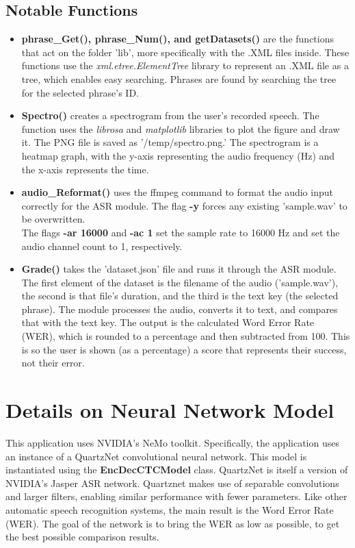 \documentclass[12pt, letterpaper]{article}
\begin{document}
\subsection*{Notable Functions}
\begin{itemize}
\item{\textbf{phrase\_Get(), phrase\_Num(), and getDatasets()} are the functions that act on the folder 'lib', more specifically with the .XML files inside. These functions use the \textit{xml.etree.ElementTree} library to represent an .XML file as a tree, which enables easy searching. Phrases are found by searching the tree for the selected phrase's ID.}

\item{\textbf{Spectro()} creates a spectrogram from the user's recorded speech. The function uses the \textit{librosa} and \textit{matplotlib} libraries to plot the figure and draw it. The PNG file is saved as '/temp/spectro.png.' The spectrogram is a heatmap graph, with the y-axis representing the audio frequency (Hz) and the x-axis represents the time.}

\item{\textbf{audio\_Reformat()} uses the ffmpeg command to format the audio input correctly for the ASR module. The flag \textbf{-y} forces any existing 'sample.wav' to be overwritten. \\The flags \textbf{-ar 16000} and \textbf{-ac 1} set the sample rate to 16000 Hz and set the audio channel count to 1, respectively.}

\item{\textbf{Grade()} takes the 'dataset.json' file and runs it through the ASR module. The first element of the dataset is the filename of the audio ('sample.wav'), the second is that file's duration, and the third is the text key (the selected phrase). The module processes the audio, converts it to text, and compares that with the text key. The output is the calculated Word Error Rate (WER), which is rounded to a percentage and then subtracted from 100. This is so the user is shown (as a percentage) a score that represents their success, not their error.


}

\end{itemize}
\newpage%

\section*{Details on Neural Network Model}
This application uses NVIDIA's NeMo toolkit. Specifically, the application uses an instance of a QuartzNet convolutional neural network. This model is instantiated using the \textbf{EncDecCTCModel} class. QuartzNet is itself a version of NVIDIA's Jasper ASR network. Quartznet makes use of separable convolutions and larger filters, enabling similar performance with fewer parameters. Like other automatic speech recognition systems, the main result is the Word Error Rate (WER). The goal of the network is to bring the WER as low as possible, to get the best possible comparison results. 
\end{document}
